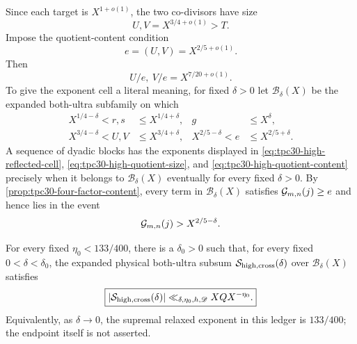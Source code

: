 Since each target is $X^{1+o(1)}$, the two co-divisors have size
\begin{equation}
 U,V=X^{3/4+o(1)}>T.
 \label{eq:tpc30-high-quotient-size}
\end{equation}
Impose the quotient-content condition
\begin{equation}
 e=(U,V)=X^{2/5+o(1)}.
 \label{eq:tpc30-high-quotient-content}
\end{equation}
Then
\begin{equation}
 U/e,\ V/e=X^{7/20+o(1)}.
 \label{eq:tpc30-high-reduced-quotients}
\end{equation}
To give the exponent cell a literal meaning, for fixed $\delta>0$ let
$\mathscr B_\delta(X)$ be the expanded both-ultra subfamily on which
\begin{align}
 X^{1/4-\delta}<r,s&\le X^{1/4+\delta},
 &g&\le X^\delta,
 \label{eq:tpc30-high-delta-reflected}\\
 X^{3/4-\delta}<U,V&\le X^{3/4+\delta},
 &X^{2/5-\delta}<e&\le X^{2/5+\delta}.
 \label{eq:tpc30-high-delta-quotient}
\end{align}
A sequence of dyadic blocks has the exponents displayed in
\eqref{eq:tpc30-high-reflected-cell},
\eqref{eq:tpc30-high-quotient-size}, and
\eqref{eq:tpc30-high-quotient-content} precisely when it belongs to
$\mathscr B_\delta(X)$ eventually for every fixed $\delta>0$.  By
\cref{prop:tpc30-four-factor-content}, every term in
$\mathscr B_\delta(X)$ satisfies $\mathcal G_{m,n}(j)\ge e$ and hence lies in
the event
\begin{equation}
 \mathcal G_{m,n}(j)>X^{2/5-\delta}.
 \label{eq:tpc30-high-target-event}
\end{equation}

\begin{corollary}
\label{cor:tpc30-high-cross-content}
For every fixed $\eta_0<133/400$, there is a $\delta_0>0$ such that,
for every fixed $0<\delta<\delta_0$, the expanded physical both-ultra
subsum $\mathcal S_{\rm high,cross}(\delta)$ over
$\mathscr B_\delta(X)$ satisfies
\begin{equation}
 \boxed{
 |\mathcal S_{\rm high,cross}(\delta)|
 \ll_{\delta,\eta_0,h,\mathscr D}XQX^{-\eta_0}.}
 \label{eq:tpc30-high-cross-bound}
\end{equation}
Equivalently, as $\delta\to0$, the supremal relaxed exponent in this
ledger is $133/400$; the endpoint itself is not asserted.
\end{corollary}

